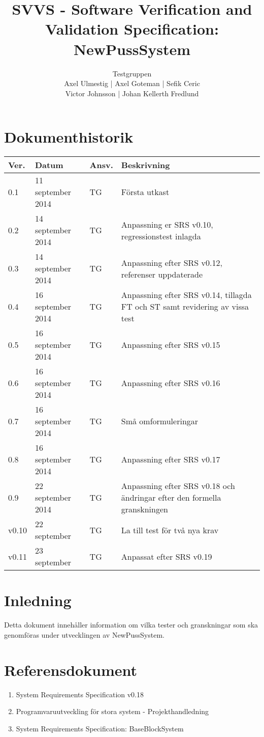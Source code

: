\documentclass[a4paper]{article}
\title{SVVS - Software Verification and Validation Specification: NewPussSystem}
\author{Testgruppen \\ Axel Ulmestig | Axel Goteman | Sefik Ceric \\ Victor Johnsson | Johan Kellerth Fredlund}
\date{}
\begin{document}
\maketitle
\thispagestyle{fancy}
\tableofcontents
\newpage

\section*{Dokumenthistorik}

\begin{tabular}{ l l l p{9cm} }
Ver. & Datum & Ansv. & Beskrivning \\\hline
0.1 & 11 september 2014 & TG & Första utkast \\
0.2 & 14 september 2014 & TG & Anpassning er SRS v0.10, regressionstest inlagda \\
0.3 & 14 september 2014 & TG & Anpassning efter SRS v0.12, referenser uppdaterade\\
0.4 & 16 september 2014 & TG & Anpassning efter SRS v0.14, tillagda FT och ST samt revidering av vissa test\\
0.5 & 16 september 2014 & TG & Anpassning efter SRS v0.15\\
0.6 & 16 september 2014 & TG & Anpassning efter SRS v0.16\\
0.7 & 16 september 2014 & TG & Små omformuleringar \\
0.8 & 16 september 2014 & TG & Anpassning efter SRS v0.17\\
0.9 & 22 september 2014 & TG & Anpassning efter SRS v0.18 och ändringar efter den formella granskningen \\
v0.10 & 22 september & TG & La till test för två nya krav \\
v0.11 & 23 september & TG & Anpassat efter SRS v0.19 \\

\end{tabular}
\section{Inledning}       

Detta dokument innehåller information om vilka tester och granskningar som ska genomföras under utvecklingen av NewPussSystem.

\section{Referensdokument}
\begin{enumerate}
\item System Requirements Specification v0.18
\item Programvaruutveckling för stora system - Projekthandledning
\item System Requirements Specification: BaseBlockSystem
\end{enumerate}
\end{document}
